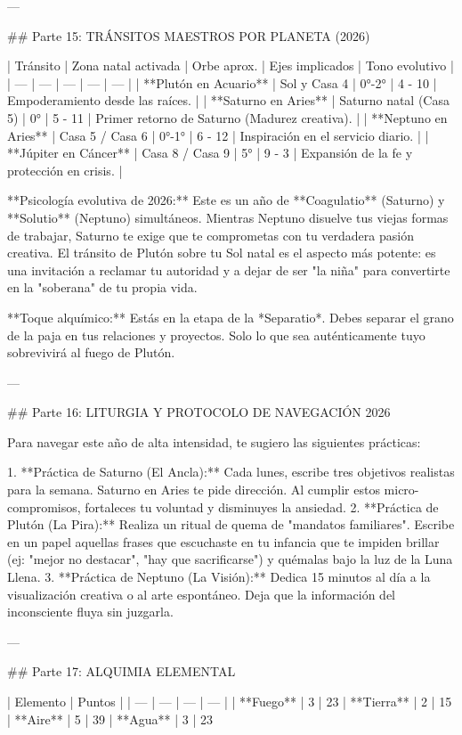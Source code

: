 ---

## Parte 15: TRÁNSITOS MAESTROS POR PLANETA (2026)

| Tránsito | Zona natal activada | Orbe aprox. | Ejes implicados | Tono evolutivo |
| --- | --- | --- | --- | --- |
| **Plutón en Acuario** | Sol y Casa 4 | 0°-2° | 4 - 10 | Empoderamiento desde las raíces. |
| **Saturno en Aries** | Saturno natal (Casa 5) | 0° | 5 - 11 | Primer retorno de Saturno (Madurez creativa). |
| **Neptuno en Aries** | Casa 5 / Casa 6 | 0°-1° | 6 - 12 | Inspiración en el servicio diario. |
| **Júpiter en Cáncer** | Casa 8 / Casa 9 | 5° | 9 - 3 | Expansión de la fe y protección en crisis. |

**Psicología evolutiva de 2026:**
Este es un año de **Coagulatio** (Saturno) y **Solutio** (Neptuno) simultáneos. Mientras Neptuno disuelve tus viejas formas de trabajar, Saturno te exige que te comprometas con tu verdadera pasión creativa. El tránsito de Plutón sobre tu Sol natal es el aspecto más potente: es una invitación a reclamar tu autoridad y a dejar de ser "la niña" para convertirte en la "soberana" de tu propia vida.

**Toque alquímico:**
Estás en la etapa de la *Separatio*. Debes separar el grano de la paja en tus relaciones y proyectos. Solo lo que sea auténticamente tuyo sobrevivirá al fuego de Plutón.

---

## Parte 16: LITURGIA Y PROTOCOLO DE NAVEGACIÓN 2026

Para navegar este año de alta intensidad, te sugiero las siguientes prácticas:

1. **Práctica de Saturno (El Ancla):** Cada lunes, escribe tres objetivos realistas para la semana. Saturno en Aries te pide dirección. Al cumplir estos micro-compromisos, fortaleces tu voluntad y disminuyes la ansiedad.
2. **Práctica de Plutón (La Pira):** Realiza un ritual de quema de "mandatos familiares". Escribe en un papel aquellas frases que escuchaste en tu infancia que te impiden brillar (ej: "mejor no destacar", "hay que sacrificarse") y quémalas bajo la luz de la Luna Llena.
3. **Práctica de Neptuno (La Visión):** Dedica 15 minutos al día a la visualización creativa o al arte espontáneo. Deja que la información del inconsciente fluya sin juzgarla.

---

## Parte 17: ALQUIMIA ELEMENTAL

| Elemento | Puntos | %
| --- | --- | --- | --- |
| **Fuego** | 3 | 23%
| **Tierra** | 2 | 15%
| **Aire** | 5 | 39%
| **Agua** | 3 | 23%

